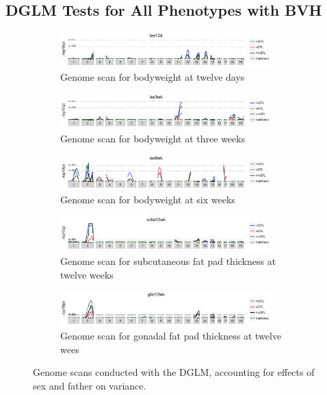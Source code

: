 \subsection{DGLM Tests for All Phenotypes with BVH}
  \begin{figure}[h]
    \begin{subfigure}{\linewidth}
      \centering
      \includegraphics[width = 0.9\textwidth]{images/scan_dglm_bw12d.pdf}
      \caption{Genome scan for bodyweight at twelve days}
      \label{fig:bw12d_cao_scan}
    \end{subfigure}
    \begin{subfigure}{\linewidth}
      \centering
      \includegraphics[width = 0.9\textwidth]{images/scan_dglm_bw3wk.pdf}
      \caption{Genome scan for bodyweight at three weeks}
      \label{fig:bw3wk_cao_scan}
    \end{subfigure}
    \begin{subfigure}{\linewidth}
      \centering
      \includegraphics[width = 0.9\textwidth]{images/scan_dglm_bw6wk.pdf}
      \caption{Genome scan for bodyweight at six weeks}
      \label{fig:bw6wk_cao_scan}
    \end{subfigure}
    \begin{subfigure}{\linewidth}
      \centering
      \includegraphics[width = 0.9\textwidth]{images/scan_dglm_scfat12wk.pdf}
      \caption{Genome scan for subcutaneous fat pad thickness at twelve weeks}
      \label{fig:scfat12wk_cao_scan}
    \end{subfigure}
    \begin{subfigure}{\linewidth}
      \centering
      \includegraphics[width = 0.9\textwidth]{images/scan_dglm_gfat12wk.pdf}
      \caption{Genome scan for gonadal fat pad thickness at twelve wees}
      \label{fig:gfat12wk_cao_scan}
    \end{subfigure}
    \caption{
      Genome scans conducted with the DGLM, accounting for effects of sex and father on variance.
    }
  \end{figure}

